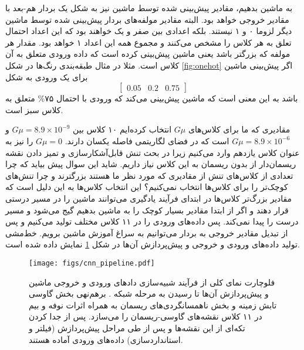 به ماشین بدهیم، مقادیر پیش‌بینی شده توسط ماشین نیز به شکل یک بردار هم-بعد با مقادیر خروجی خواهد بود. البته مقادیر مولفه‌های بردار پیش‌بینی شده توسط ماشین دیگر لزوما ۰ و ۱ نیستند. بلکه اعدادی بین صفر و یک خواهند بود که این اعداد احتمال تعلق به هر کلاس را مشخص می‌کنند و مجموع همه این اعداد ۱ خواهد بود. مقدار هر مولفه که بزرگتر باشد یعنی ماشین پیش‌بینی کرده است که داده ورودی متعلق به آن کلاس است. مثلا در مثال طبقه‌بندی رنگ‌ها در شکل
\ref{fig:onehot}
اگر پیش‌بینی ماشین برای یک ورودی به شکل
\[
\begin{bmatrix}
0.05  & 0.2 & 0.75
\end{bmatrix}
\]
باشد به این معنی است که ماشین پیش‌بینی می‌کند که ورودی با احتمال ۷۵\% متعلق به کلاس سبز است.
\par
مقادیری که ما برای کلاس‌های $G\mu$ انتخاب کرده‌ایم ۱۰ کلاس بین 
$G\mu=8.9\times 10^{-9}$
و
$G\mu=8.9\times 10^{-6}$  
است که در فضای لگاریتمی فاصله یکسان دارند.  
$G\mu=0$  
را نیز به عنوان کلاس یازدهم وارد می‌کنیم زیرا در بحث تنش قابل‌آشکارسازی و تمیز دادن نقشه ریسمان‌دار از بدون ریسمان به این کلاس نیاز داریم. شاید این سوال پیش بیاید که چرا تعدادی از کلاس‌های تنش از مقادیری که مورد نظر ما هستند بزرگترند و چرا تنش‌های کوچک‌تر را برای کلاس‌ها انتخاب نمی‌کنیم؟ این انتخاب کلاس‌ها به این دلیل است که مقادیر بزرگ‌تر کلاس‌ها در ابتدای فرآیند یادگیری می‌توانند ماشین را در مسیر درستی قرار دهند و اگر از ابتدا مقادیر بسیار کوچک را به ماشین بدهیم گیج می‌شود و مسیر درست را پیدا نمی‌کند. پس داده‌های ورودی را در ۱۱ کلاس مختلف تولید می‌کنیم و پس از تبدیل مقادیر خروجی به بردار 
می‌توانیم به سراغ آموزش ماشین برویم.
 خط‌مشی تولید داده‌های ورودی و خروجی و پیش‌پردازش آن‌ها در شکل 
\ref{fig:cnn_pipeline}
نمایش داده شده است.
\begin{figure}
	\begin{center}
		\texttt{[image: figs/cnn\_pipeline.pdf]}
	\end{center}
	\caption[
	فلوچارت نمای کلی از فرآیند شبیه‌سازی دادهای ورودی و خروجی ماشین و پیش‌پردازش آن‌ها تا رسیدن به مرحله شبکه
	.
	برهم‌نهی بخش گاوسی تابش زمینه و بخش ناهمسانگردی‌های ریسمان به همراه اثرات نوفه و بیم در ۱۱ کلاس
		  نقشه‌های گاوسی-ریسمان را می‌سازد. پس از جدا کردن تکه‌ای از این نقشه‌ها و پس از طی مراحل پیش‌پردازش (فیلتر و استانداردسازی) داده‌های ورودی 
	آماده هستند.   
	]{فلوچارت نمای کلی از فرآیند شبیه‌سازی دادهای ورودی و خروجی ماشین و پیش‌پردازش آن‌ها تا رسیدن به مرحله شبکه
		.
		برهم‌نهی بخش گاوسی تابش زمینه و بخش ناهمسانگردی‌های ریسمان به همراه اثرات نوفه و بیم در ۱۱ کلاس
		نقشه‌های گاوسی-ریسمان را می‌سازد. پس از جدا کردن تکه‌ای از این نقشه‌ها و پس از طی مراحل پیش‌پردازش (فیلتر و استانداردسازی) داده‌های ورودی 
		آماده هستند.        
	}
	\label{fig:cnn_pipeline}
\end{figure}

